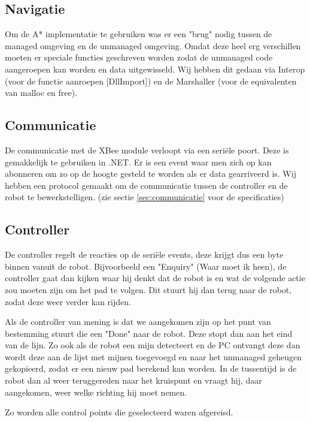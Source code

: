\documentclass{report}
\begin{document}
\subsection{Navigatie}
Om de A* implementatie te gebruiken was er een "brug" nodig tussen de managed omgeving en de unmanaged omgeving.
Omdat deze heel erg verschillen moeten er speciale functies geschreven worden zodat de unmanaged code aangeroepen kan worden en data uitgewisseld.
Wij hebben dit gedaan via Interop (voor de functie aanroepen [DllImport]) en de Marshaller (voor de equivalenten van malloc en free).
\subsection{Communicatie}
De communicatie met de XBee module verloopt via een seriële poort. Deze is gemakkelijk te gebruiken in .NET. Er is een event waar men zich op kan abonneren om zo op de hoogte gesteld te worden als er data gearriveerd is. Wij hebben een protocol gemaakt om de communicatie tussen de controller en de robot te bewerkstelligen. (zie sectie \ref{sec:communicatie} voor de specificaties)

\subsection{Controller}
De controller regelt de reacties op de seriële events, deze krijgt dus een byte binnen vanuit de robot. Bijvoorbeeld een "Enquiry" (Waar moet ik heen), de controller gaat dan kijken waar hij denkt dat de robot is en wat de volgende actie zou moeten zijn om het pad te volgen.
Dit stuurt hij dan terug naar de robot, zodat deze weer verder kan rijden.

Als de controller van mening is dat we aangekomen zijn op het punt van bestemming stuurt die een "Done" naar de robot. Deze stopt dan aan het eind van de lijn.
Zo ook als de robot een mijn detecteert en de PC ontvangt deze dan wordt deze aan de lijst met mijnen toegevoegd en naar het unmanaged geheugen gekopieerd, zodat er een nieuw pad berekend kan worden.
In de tussentijd is de robot dan al weer teruggereden naar het kruispunt en vraagt hij, daar aangekomen, weer welke richting hij moet nemen.

Zo worden alle control points die geselecteerd waren afgereisd.
\end{document}

